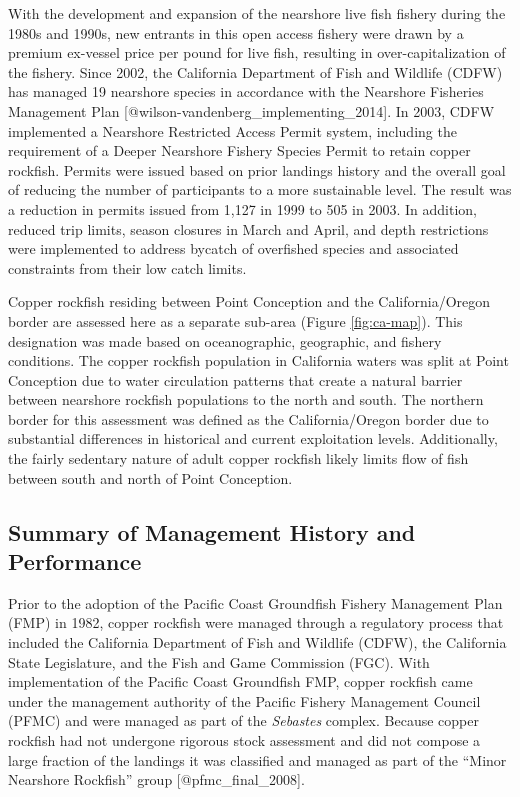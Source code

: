 \documentclass[11pt,
  letterpaper,
]{article}
\begin{document}
With the development and expansion of the nearshore live fish fishery during the 1980s and 1990s, new entrants in this open access fishery were drawn by a premium ex-vessel price per pound for live fish, resulting in over-capitalization of the fishery. Since 2002, the California Department of Fish and Wildlife (CDFW) has managed 19 nearshore species in accordance with the Nearshore Fisheries Management Plan {[}@wilson-vandenberg\_implementing\_2014{]}. In 2003, CDFW implemented a Nearshore Restricted Access Permit system, including the requirement of a Deeper Nearshore Fishery Species Permit to retain copper rockfish. Permits were issued based on prior landings history and the overall goal of reducing the number of participants to a more sustainable level. The result was a reduction in permits issued from 1,127 in 1999 to 505 in 2003. In addition, reduced trip limits, season closures in March and April, and depth restrictions were implemented to address bycatch of overfished species and associated constraints from their low catch limits.

Copper rockfish residing between Point Conception and the California/Oregon border are assessed here as a separate sub-area (Figure \ref{fig:ca-map}). This designation was made based on oceanographic, geographic, and fishery conditions. The copper rockfish population in California waters was split at Point Conception due to water circulation patterns that create a natural barrier between nearshore rockfish populations to the north and south. The northern border for this assessment was defined as the California/Oregon border due to substantial differences in historical and current exploitation levels. Additionally, the fairly sedentary nature of adult copper rockfish likely limits flow of fish between south and north of Point Conception.

\subsection{Summary of Management History and Performance}\label{summary-of-management-history-and-performance}

Prior to the adoption of the Pacific Coast Groundfish Fishery Management Plan (FMP) in 1982, copper rockfish were managed through a regulatory process that included the California Department of Fish and Wildlife (CDFW), the California State Legislature, and the Fish and Game Commission (FGC). With implementation of the Pacific Coast Groundfish FMP, copper rockfish came under the management authority of the Pacific Fishery Management Council (PFMC) and were managed as part of the \emph{Sebastes} complex. Because copper rockfish had not undergone rigorous stock assessment and did not compose a large fraction of the landings it was classified and managed as part of the ``Minor Nearshore Rockfish'' group {[}@pfmc\_final\_2008{]}.
\end{document}
